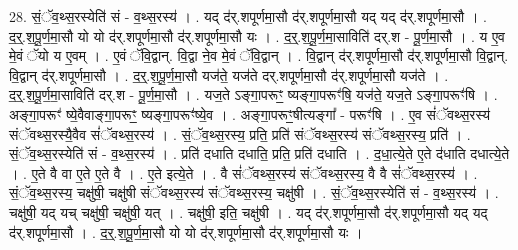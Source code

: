 \documentclass[17pt]{extarticle}
\begin{document}
28. सं॒ॅव॒थ्स॒रस्येति॑ सं - व॒थ्स॒रस्य॑ । . यद् द॑र्.शपूर्णमा॒सौ द॑र्.शपूर्णमा॒सौ यद् यद् द॑र्.शपूर्णमा॒सौ । . द॒र्॒.श॒पू॒र्ण॒मा॒सौ यो यो द॑र्.शपूर्णमा॒सौ द॑र्.शपूर्णमा॒सौ यः । . द॒र्॒.श॒पू॒र्ण॒मा॒साविति॑ दर्.श - पू॒र्ण॒मा॒सौ । . य ए॒व मे॒वं ॅयो य ए॒वम् । . ए॒वं ॅवि॒द्वान्. वि॒द्वा ने॒व मे॒वं ॅवि॒द्वान् । . वि॒द्वान् द॑र्.शपूर्णमा॒सौ द॑र्.शपूर्णमा॒सौ वि॒द्वान्. वि॒द्वान् द॑र्.शपूर्णमा॒सौ । . द॒र्॒.श॒पू॒र्ण॒मा॒सौ यज॑ते॒ यज॑ते दर्.शपूर्णमा॒सौ द॑र्.शपूर्णमा॒सौ यज॑ते । . द॒र्॒.श॒पू॒र्ण॒मा॒साविति॑ दर्.श - पू॒र्ण॒मा॒सौ । . यज॒ते ऽङ्गा॒परूꣳ॒॒ ष्यङ्गा॒परूꣳ॑षि॒ यज॑ते॒ यज॒ते ऽङ्गा॒परूꣳ॑षि । . अङ्गा॒परूꣳ॑ ष्ये॒वैवाङ्गा॒परूꣳ॒॒ ष्यङ्गा॒परूꣳ॑ष्ये॒व । . अङ्गा॒परूꣳ॒॒षीत्यङ्गा᳚ - परूꣳ॑षि । . ए॒व सं॑ॅवथ्स॒रस्य॑ संॅवथ्स॒रस्यै॒वैव सं॑ॅवथ्स॒रस्य॑ । . सं॒ॅव॒थ्स॒रस्य॒ प्रति॒ प्रति॑ संॅवथ्स॒रस्य॑ संॅवथ्स॒रस्य॒ प्रति॑ । . सं॒ॅव॒थ्स॒रस्येति॑ सं - व॒थ्स॒रस्य॑ । . प्रति॑ दधाति दधाति॒ प्रति॒ प्रति॑ दधाति । . द॒धा॒त्ये॒ते ए॒ते द॑धाति दधात्ये॒ते । . ए॒ते वै वा ए॒ते ए॒ते वै । . ए॒ते इत्ये॒ते । . वै सं॑ॅवथ्स॒रस्य॑ संॅवथ्स॒रस्य॒ वै वै सं॑ॅवथ्स॒रस्य॑ । . सं॒ॅव॒थ्स॒रस्य॒ चक्षु॑षी॒ चक्षु॑षी संॅवथ्स॒रस्य॑ संॅवथ्स॒रस्य॒ चक्षु॑षी । . सं॒ॅव॒थ्स॒रस्येति॑ सं - व॒थ्स॒रस्य॑ । . चक्षु॑षी॒ यद् यच् चक्षु॑षी॒ चक्षु॑षी॒ यत् । . चक्षु॑षी॒ इति॒ चक्षु॑षी । . यद् द॑र्.शपूर्णमा॒सौ द॑र्.शपूर्णमा॒सौ यद् यद् द॑र्.शपूर्णमा॒सौ । . द॒र्॒.श॒पू॒र्ण॒मा॒सौ यो यो द॑र्.शपूर्णमा॒सौ द॑र्.शपूर्णमा॒सौ यः । \newline
\end{document}
